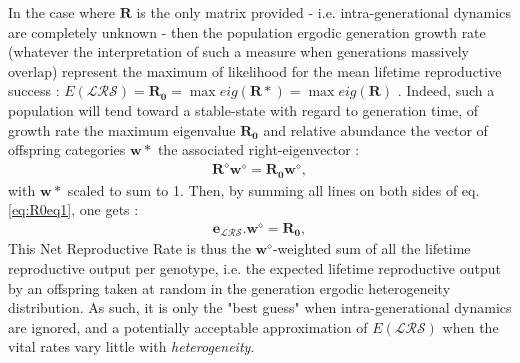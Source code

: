 \documentclass[10pt,a4paper]{article}
\begin{document}
{{     In the case where $\mathbf{R}$ is the only matrix provided - i.e. intra-generational dynamics are completely unknown - then the population ergodic generation growth rate (whatever the interpretation of such a measure when generations massively overlap) represent the maximum of likelihood for the mean lifetime reproductive success : 
$E(\mathcal{LRS})=\mathbf{R_{0}}=\max eig(\mathbf{R*})=\max eig(\mathbf{R}) $ \citep{DeCaminoBeck2008,Caswell2011b,Cushing1994,Jones2007a}.
Indeed, such a population will tend toward a stable-state with regard to  generation time, of growth rate the maximum eigenvalue $\mathbf{R_{0}}$  and relative abundance the vector of offspring categories $\mathbf{w*}$ the associated right-eigenvector :
\begin{eqnarray}
\mathbf{R^{\diamond}}\mathbf{w^{\diamond}}=\mathbf{R_{0}}\mathbf{w^{\diamond}}
\label{eq:R0eq1}, 
\end{eqnarray}
with $\mathbf{w*}$ scaled to sum to 1.  Then, by summing all lines on both sides of eq. \ref{eq:R0eq1}, one gets :
\begin{eqnarray}
\mathbf{e}_{\mathcal{LRS}}.\mathbf{w^{\diamond}}=\mathbf{R_{0}}
\label{eq:R0eq2}, 
\end{eqnarray}
This Net Reproductive Rate is thus the $\mathbf{w^{\diamond}}$-weighted sum of all the lifetime reproductive output per genotype, i.e. the expected lifetime reproductive output by an offspring taken at random in the generation ergodic heterogeneity distribution.
As such, it is only the "best guess" when intra-generational dynamics are ignored, and a potentially acceptable approximation of $E(\mathcal{LRS})$ when the vital rates vary little with \emph{heterogeneity}. \\

}}
\end{document}
